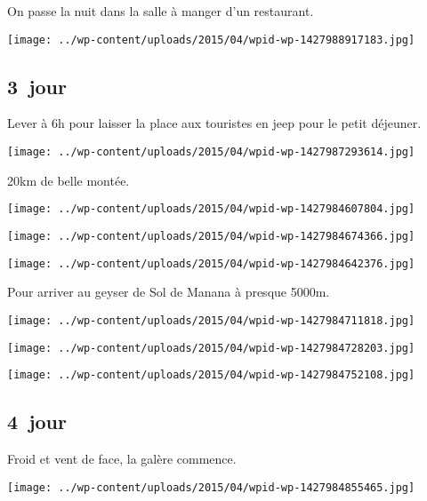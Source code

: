  On passe la nuit dans la salle à manger d'un restaurant.
\begin{center} \texttt{[image: ../wp-content/uploads/2015/04/wpid-wp-1427988917183.jpg]} \end{center}

\pagebreak
\subsection*{3\ieme\ jour} 
 Lever à 6h pour laisser la place aux touristes en jeep pour le petit déjeuner.
\begin{center} \texttt{[image: ../wp-content/uploads/2015/04/wpid-wp-1427987293614.jpg]} \end{center}

 20km de belle montée.
\begin{center} \texttt{[image: ../wp-content/uploads/2015/04/wpid-wp-1427984607804.jpg]} \end{center}
\begin{center} \texttt{[image: ../wp-content/uploads/2015/04/wpid-wp-1427984674366.jpg]} \end{center}
\begin{center} \texttt{[image: ../wp-content/uploads/2015/04/wpid-wp-1427984642376.jpg]} \end{center}

\pagebreak
  Pour arriver au geyser de Sol de Manana à presque 5000m.
\begin{center} \texttt{[image: ../wp-content/uploads/2015/04/wpid-wp-1427984711818.jpg]} \end{center}
\begin{center} \texttt{[image: ../wp-content/uploads/2015/04/wpid-wp-1427984728203.jpg]} \end{center}
\begin{center} \texttt{[image: ../wp-content/uploads/2015/04/wpid-wp-1427984752108.jpg]} \end{center}

 \subsection*{4\ieme\ jour} 

 Froid et vent de face, la galère commence.
\begin{center} \texttt{[image: ../wp-content/uploads/2015/04/wpid-wp-1427984855465.jpg]} \end{center}

